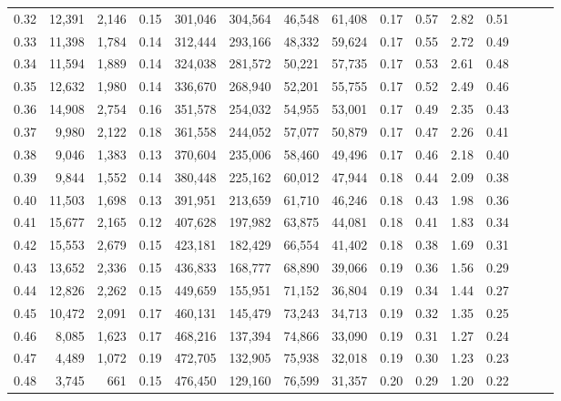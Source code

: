 \begin{tabular}{rrrrrrrrrrrrrrr}
0.32 &  12,391 &  2,146 &  0.15 &  301,046 &  304,564 &   46,548 &   61,408 &  0.17 &  0.57 &  2.82 &      0.51 \\
0.33 &  11,398 &  1,784 &  0.14 &  312,444 &  293,166 &   48,332 &   59,624 &  0.17 &  0.55 &  2.72 &      0.49 \\
0.34 &  11,594 &  1,889 &  0.14 &  324,038 &  281,572 &   50,221 &   57,735 &  0.17 &  0.53 &  2.61 &      0.48 \\
0.35 &  12,632 &  1,980 &  0.14 &  336,670 &  268,940 &   52,201 &   55,755 &  0.17 &  0.52 &  2.49 &      0.46 \\
0.36 &  14,908 &  2,754 &  0.16 &  351,578 &  254,032 &   54,955 &   53,001 &  0.17 &  0.49 &  2.35 &      0.43 \\
0.37 &   9,980 &  2,122 &  0.18 &  361,558 &  244,052 &   57,077 &   50,879 &  0.17 &  0.47 &  2.26 &      0.41 \\
0.38 &   9,046 &  1,383 &  0.13 &  370,604 &  235,006 &   58,460 &   49,496 &  0.17 &  0.46 &  2.18 &      0.40 \\
0.39 &   9,844 &  1,552 &  0.14 &  380,448 &  225,162 &   60,012 &   47,944 &  0.18 &  0.44 &  2.09 &      0.38 \\
0.40 &  11,503 &  1,698 &  0.13 &  391,951 &  213,659 &   61,710 &   46,246 &  0.18 &  0.43 &  1.98 &      0.36 \\
0.41 &  15,677 &  2,165 &  0.12 &  407,628 &  197,982 &   63,875 &   44,081 &  0.18 &  0.41 &  1.83 &      0.34 \\
0.42 &  15,553 &  2,679 &  0.15 &  423,181 &  182,429 &   66,554 &   41,402 &  0.18 &  0.38 &  1.69 &      0.31 \\
0.43 &  13,652 &  2,336 &  0.15 &  436,833 &  168,777 &   68,890 &   39,066 &  0.19 &  0.36 &  1.56 &      0.29 \\
0.44 &  12,826 &  2,262 &  0.15 &  449,659 &  155,951 &   71,152 &   36,804 &  0.19 &  0.34 &  1.44 &      0.27 \\
0.45 &  10,472 &  2,091 &  0.17 &  460,131 &  145,479 &   73,243 &   34,713 &  0.19 &  0.32 &  1.35 &      0.25 \\
0.46 &   8,085 &  1,623 &  0.17 &  468,216 &  137,394 &   74,866 &   33,090 &  0.19 &  0.31 &  1.27 &      0.24 \\
0.47 &   4,489 &  1,072 &  0.19 &  472,705 &  132,905 &   75,938 &   32,018 &  0.19 &  0.30 &  1.23 &      0.23 \\
0.48 &   3,745 &    661 &  0.15 &  476,450 &  129,160 &   76,599 &   31,357 &  0.20 &  0.29 &  1.20 &      0.22 \\

\end{tabular}
